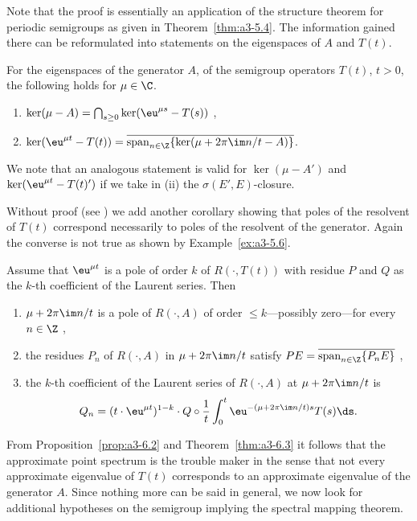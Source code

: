 Note that the proof is essentially an application of the structure theorem for periodic semigroups as given in Theorem~\ref{thm:a3-5.4}.
The information gained there can be reformulated into statements on the eigenspaces of\/ $A$ and $T(t)$.
\begin{corollary}\label{cor:a3-6.4}
For the eigenspaces of the generator $A$, \resp of the semigroup operators $T(t)$, $t > 0$, the following holds  for  $\mu \in \C$. 
\begin{enumerate}[\upshape (i)]
\item 
$\ker(\mu - A) = \bigcap_{s \geq 0} \ker(\eu^{\mu s} - T(s))$ ,

\item 
$\ker(\eu^{\mu t} - T(t)) = \overline{\mathrm{span}_{n \in \Z} \{\ker(\mu + 2\pi\im  n/t - A)\}}$. 

\end{enumerate}
\end{corollary}
We note that an analogous statement is valid for $\ker(\mu - A')$ and $\ker(\eu^{\mu t} - T(t)')$ if we take in (ii) the $\sigma(E',E)$-closure.

Without proof (see \textcite[Proposition~1.10]{greiner:1981}) we add another corollary showing that poles of the resolvent of\/ $T(t)$ correspond necessarily to poles of the resolvent of the generator.
Again the converse is not true as shown by Example~\ref{ex:a3-5.6}.
\begin{corollary}\label{cor:a3-6.5}
Assume that $\eu^{\mu t}$ is a pole of order $k$ of\/ $R(\cdot,T(t))$ with residue $P$ and $Q$ as the $k$-th coefficient of the Laurent series.
Then
\begin{enumerate}[\upshape (i)]
\item 
$\mu + 2\pi\im  n/t$ is a pole of\/ $R(\cdot,A)$ of order $\leq k$---possibly zero---for every $n \in \Z$ ,

\item 
the residues $P_{n}$ of $R(\cdot,A)$ in $\mu + 2\pi\im  n/t$ satisfy $PE = \overline{\text{span}_{n \in \Z} \{P_{n}E\}}$ ,

\item 
the $k$-th coefficient of the Laurent series of\/ $R(\cdot,A)$ at $\mu + 2\pi\im  n/t$ is
\[
Q_{n} = (t \cdot \eu^{\mu t})^{1-k} \cdot Q \circ \frac{1}{t} \int_{0}^{t} \eu^{-(\mu+2\pi\im  n/t)s}T(s) \ds .
\]
\end{enumerate}
\end{corollary}
From Proposition~\ref{prop:a3-6.2} and Theorem~\ref{thm:a3-6.3} it follows that the approximate point spectrum 
is the trouble maker in the sense that not every approximate eigenvalue of\/ $T(t)$ corresponds to an approximate eigenvalue of the generator $A$.
Since nothing more can be said in general, we now look for additional hypotheses on the semigroup implying the spectral mapping theorem.

